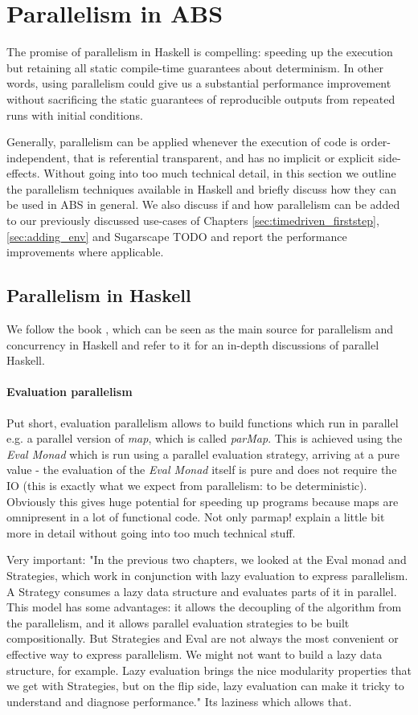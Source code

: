 \section{Parallelism in ABS}
The promise of parallelism in Haskell is compelling: speeding up the execution but retaining all static compile-time guarantees about determinism. In other words, using parallelism could give us a substantial performance improvement without sacrificing the static guarantees of reproducible outputs from repeated runs with initial conditions.

Generally, parallelism can be applied whenever the execution of code is order-independent, that is referential transparent, and has no implicit or explicit side-effects. Without going into too much technical detail, in this section we outline the parallelism techniques available in Haskell and briefly discuss how they can be used in ABS in general. We also discuss if and how parallelism can be added to our previously discussed use-cases of Chapters \ref{sec:timedriven_firststep}, \ref{sec:adding_env} and Sugarscape TODO and report the performance improvements where applicable.

\subsection{Parallelism in Haskell}
We follow the book \cite{marlow_parallel_2013}, which can be seen as the main source for parallelism and concurrency in Haskell and refer to it for an in-depth discussions of parallel Haskell.

\paragraph{Evaluation parallelism}
Put short, evaluation parallelism allows to build functions which run in parallel e.g. a parallel version of \textit{map}, which is called \textit{parMap}. This is achieved using the \textit{Eval Monad} which is run using a parallel evaluation strategy, arriving at a pure value - the evaluation of the \textit{Eval Monad} itself is pure and does not require the IO (this is exactly what we expect from parallelism: to be deterministic). Obviously this gives huge potential for speeding up programs because maps are omnipresent in a lot of functional code. Not only parmap! explain a little bit more in detail without going into too much technical stuff.

Very important: "In the previous two chapters, we looked at the Eval monad and Strategies, which work in conjunction with lazy evaluation to express parallelism. A Strategy consumes a lazy data structure and evaluates parts of it in parallel. This model has some advantages: it allows the decoupling of the algorithm from the parallelism, and it allows parallel evaluation strategies to be built compositionally. But Strategies and Eval are not always the most convenient or effective way to express parallelism. We might not want to build a lazy data structure, for example. Lazy evaluation brings the nice modularity properties that we get with Strategies, but on the flip side, lazy evaluation can make it tricky to understand and diagnose performance."
Its laziness which allows that.

